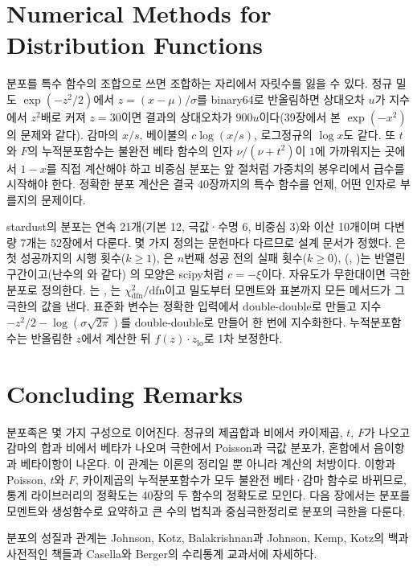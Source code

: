 \section{Numerical Methods for Distribution Functions}
\label{sec:families-numerics}

분포를 특수 함수의 조합으로 쓰면 조합하는 자리에서 자릿수를 잃을 수 있다. 정규 밀도 $\exp(-z^2/2)$에서 $z=(x-\mu)/\sigma$를 binary64로 반올림하면 상대오차 $u$가 지수에서 $z^2$배로 커져 $z=30$이면 결과의 상대오차가 $900u$이다(39장에서 본 $\exp(-x^2)$의 문제와 같다). 감마의 $x/s$, 베이불의 $c\log(x/s)$, 로그정규의 $\log x$도 같다. 또 $t$와 $F$의 누적분포함수는 불완전 베타 함수의 인자 $\nu/(\nu+t^2)$이 $1$에 가까워지는 곳에서 $1-x$를 직접 계산해야 하고 비중심 분포는 앞 절처럼 가중치의 봉우리에서 급수를 시작해야 한다. 정확한 분포 계산은 결국 40장까지의 특수 함수를 언제, 어떤 인자로 부를지의 문제이다.

\begin{instardust}
stardust의 분포는 연속 21개(기본 12, 극값·수명 6, 비중심 3)와 이산 10개이며 다변량 7개는 52장에서 다룬다. 몇 가지 정의는 문헌마다 다르므로 설계 문서가 정했다. 은 첫 성공까지의 시행 횟수($k\ge1$), 은 $n$번째 성공 전의 실패 횟수($k\ge0$), (, )는 반열린 구간이고(난수의 와 같다) 의 모양은 scipy처럼 $c=-\xi$이다. 자유도가 무한대이면 극한 분포로 정의한다. 는 , 는 $\chi^2_{\text{dfn}}/\text{dfn}$이고 밀도부터 모멘트와 표본까지 모든 메서드가 그 극한의 값을 낸다. 표준화 변수는 정확한 입력에서 double-double로 만들고 지수 $-z^2/2-\log(\sigma\sqrt{2\pi})$를 double-double로 만들어 한 번에 지수화한다. 누적분포함수는 반올림한 $z$에서 계산한 뒤 $f(z)\cdot z_{\mathrm{lo}}$로 1차 보정한다.
\end{instardust}

\section{Concluding Remarks}

분포족은 몇 가지 구성으로 이어진다. 정규의 제곱합과 비에서 카이제곱, $t$, $F$가 나오고 감마의 합과 비에서 베타가 나오며 극한에서 Poisson과 극값 분포가, 혼합에서 음이항과 베타이항이 나온다. 이 관계는 이론의 정리일 뿐 아니라 계산의 처방이다. 이항과 Poisson, $t$와 $F$, 카이제곱의 누적분포함수가 모두 불완전 베타·감마 함수로 바뀌므로, 통계 라이브러리의 정확도는 40장의 두 함수의 정확도로 모인다. 다음 장에서는 분포를 모멘트와 생성함수로 요약하고 큰 수의 법칙과 중심극한정리로 분포의 극한을 다룬다.

분포의 성질과 관계는 Johnson, Kotz, Balakrishnan\cite{johnson1994continuous,johnson1995continuous}과 Johnson, Kemp, Kotz\cite{johnson2005discrete}의 백과사전적인 책들과 Casella와 Berger의 수리통계 교과서\cite{casella2002}에 자세하다.

\chapterreferences
